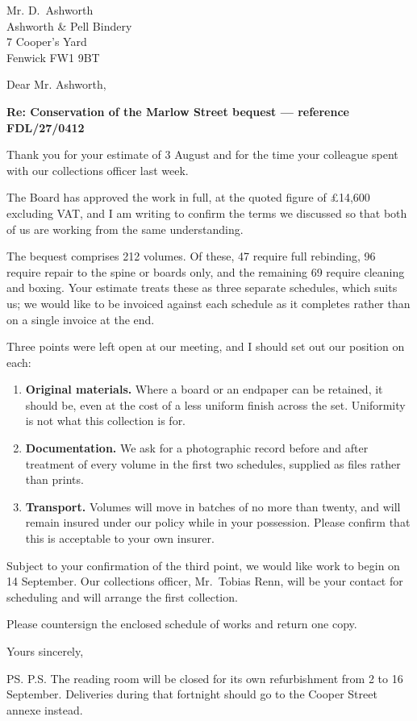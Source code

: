 \documentclass[11pt,a4paper]{letter}
\begin{document}
\begin{letter}{
  Mr. D.\ Ashworth \\
  Ashworth \& Pell Bindery \\
  7 Cooper's Yard \\
  Fenwick FW1 9BT
}

\opening{Dear Mr. Ashworth,}

\textbf{Re: Conservation of the Marlow Street bequest --- reference FDL/27/0412}

Thank you for your estimate of 3 August and for the time your colleague spent
with our collections officer last week.

The Board has approved the work in full, at the quoted figure of £14,600
excluding VAT, and I am writing to confirm the terms we discussed so that both
of us are working from the same understanding.

The bequest comprises 212 volumes. Of these, 47 require full rebinding, 96
require repair to the spine or boards only, and the remaining 69 require
cleaning and boxing. Your estimate treats these as three separate schedules,
which suits us; we would like to be invoiced against each schedule as it
completes rather than on a single invoice at the end.

Three points were left open at our meeting, and I should set out our position on
each:

\begin{enumerate}
  \item \textbf{Original materials.} Where a board or an endpaper can be
        retained, it should be, even at the cost of a less uniform finish
        across the set. Uniformity is not what this collection is for.
  \item \textbf{Documentation.} We ask for a photographic record before and
        after treatment of every volume in the first two schedules, supplied as
        files rather than prints.
  \item \textbf{Transport.} Volumes will move in batches of no more than
        twenty, and will remain insured under our policy while in your
        possession. Please confirm that this is acceptable to your own insurer.
\end{enumerate}

Subject to your confirmation of the third point, we would like work to begin on
14 September. Our collections officer, Mr.\ Tobias Renn, will be your contact
for scheduling and will arrange the first collection.

Please countersign the enclosed schedule of works and return one copy.

\closing{Yours sincerely,}

\ps{P.S. The reading room will be closed for its own refurbishment from 2 to 16
September. Deliveries during that fortnight should go to the Cooper Street
annexe instead.}

\end{letter}
\end{document}
